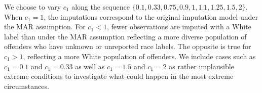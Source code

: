 \documentclass[
  letterpaper,
  DIV=11,
  numbers=noendperiod]{scrartcl}
\begin{document}
We choose to vary \(c_1\) along the sequence
\(\{0.1, 0.33, 0.75, 0.9, 1, 1.1, 1.25, 1.5, 2\}.\) When \(c_1 = 1\),
the imputations correspond to the original imputation model under the
MAR assumption. For \(c_1 < 1\), fewer observations are imputed with a
White label than under the MAR assumption reflecting a more diverse
population of offenders who have unknown or unreported race labels. The
opposite is true for \(c_1 > 1\), reflecting a more White population of
offenders. We include cases such as \(c_1 = 0.1\) and \(c_1 = 0.33\) as
well as \(c_1 = 1.5\) and \(c_1 = 2\) as rather implausible extreme
conditions to investigate what could happen in the most extreme
circumstances.

\begin{figure}

\begin{minipage}[t]{0.50\linewidth}

{\centering 


}

\end{minipage}%
%
\begin{minipage}[t]{0.50\linewidth}

{\centering 


}

\end{minipage}%
\newline
\begin{minipage}[t]{0.50\linewidth}

{\centering 


}

\end{minipage}%
%
\begin{minipage}[t]{0.50\linewidth}


\end{minipage}
\end{figure}
\end{document}
